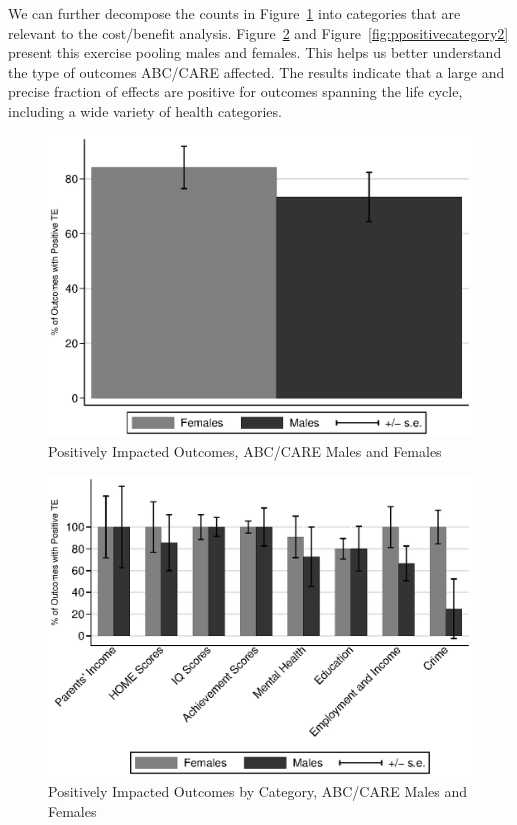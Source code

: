 We can further decompose the counts in Figure~\ref{fig:ppositive} into categories that are relevant to the cost/benefit analysis. Figure~\ref{fig:ppositivecategory1} and Figure~\ref{fig:ppositivecategory2} present this exercise pooling males and females. This helps us better understand the type of outcomes ABC/CARE affected. The results indicate that a large and precise fraction of effects are positive for outcomes spanning the life cycle, including a wide variety of health categories.

\begin{figure}[H]
		\caption{Positively Impacted Outcomes, ABC/CARE Males and Females} \label{fig:ppositive}
		\includegraphics[width=.7\columnwidth]{output/itt_noctrl_all.eps}
\end{figure}

\begin{figure}[H]
		\caption{Positively Impacted Outcomes by Category, ABC/CARE Males and Females} \label{fig:ppositivecategory1}
		\includegraphics[width=.8\columnwidth]{output/itt_noctrl_cats1.eps}
\end{figure}

